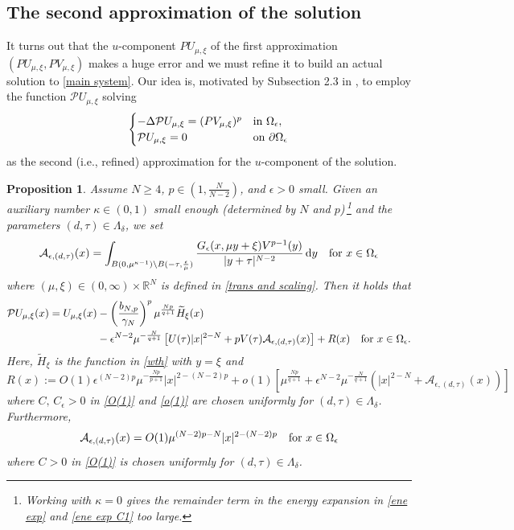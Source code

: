 \documentclass[reqno]{amsart}
\newtheorem{proposition}[theorem]{Proposition}
\theoremstyle{remark}
\newcommand{\pa}{\partial}
\newcommand{\ep}{\epsilon}
\newcommand{\ga}{\gamma}
\newcommand{\R}{\mathbb{R}}
\newcommand{\mca}{\mathcal{A}}
\newcommand{\mcp}{\mathcal{P}}
\newcommand{\wth}{\widetilde{H}}
\newcommand{\dy}{\textup{d}y}
\newcommand{\mx}{{\mu,\xi}}
\renewcommand{\(}{\left(}
\renewcommand{\)}{\right)}
\numberwithin{equation}{section}
\begin{document}
\subsection{The second approximation of the solution}
It turns out that the $u$-component $PU_\mx$ of the first approximation $(PU_\mx, PV_\mx)$ makes a huge error and we must refine it to build an actual solution to \eqref{main system}.
Our idea is, motivated by Subsection 2.3 in \cite{KP}, to employ the function $\mcp U_\mx$ solving
\begin{equation}\label{mcp U eq}
\begin{cases}
-\Delta \mcp U_\mx = (PV_\mx)^p &\textup{in } \Omega_\ep,\\
\mcp U_\mx =0 &\textup{on } \pa \Omega_\ep
\end{cases}
\end{equation}
as the second (i.e., refined) approximation for the $u$-component of the solution.
\begin{proposition}\label{second approx}
Assume $N \ge 4$, $p \in (1,\frac{N}{N-2})$, and $\ep > 0$ small. Given an auxiliary number $\kappa \in (0,1)$ small enough (determined by $N$ and $p$)\,\footnote{Working with $\kappa = 0$
gives the remainder term in the energy expansion in \eqref{ene exp} and \eqref{ene exp C1} too large.} and the parameters $(d,\tau) \in \Lambda_\delta$, we set
\begin{equation}\label{A mu}
\mca_{\ep,(d,\tau)}(x) = \int_{B(0,\mu^{\kappa-1})\setminus B(-\tau,\frac{\ep}{\mu})} \frac{G_\ep(x,\mu y+\xi)V^{p-1}(y)}{|y+\tau|^{N-2}}\, \dy \quad \textup{for } x \in \Omega_\ep
\end{equation}
where $(\mu,\xi) \in (0,\infty) \times \R^N$ is defined in \eqref{trans and scaling}. Then it holds that
\begin{equation}\label{mcp U}
\begin{aligned}
\mcp U_\mx(x) = U_\mx(x)
&- \(\frac{b_{N,p}}{\ga_N}\)^p\mu^{\frac{Np}{q+1}}\wth_\xi(x) \\
&- \ep^{N-2}\mu^{-\frac{N}{q+1}} \left[U(\tau) {|x|^{2-N}} +p V(\tau) \mca_{\ep,(d,\tau)}(x)\right] + R(x) \quad \textup{for } x \in \Omega_\ep.
\end{aligned}
\end{equation}
Here, $\wth_\xi$ is the function in \eqref{wth} with $y = \xi$ and
\begin{equation}\label{R}
R(x) := O(1) \ep^{(N-2)p}\mu^{-\frac{Np}{p+1}}|x|^{2-(N-2)p} + o(1)\left[\mu^{\frac{N p}{q+1}} + \ep^{N-2}\mu^{-\frac{N}{q+1}} \({|x|^{2-N}}+\mca_{\ep,(d,\tau)}(x)\)\right]
\end{equation}
where $C,\, C_\ep > 0$ in \eqref{O(1)} and \eqref{o(1)} are chosen uniformly for $(d,\tau)\in \Lambda_\delta$. Furthermore,
\begin{equation}\label{mca est}
\mca_{\ep,(d,\tau)}(x) = O(1)\mu^{(N-2)p-N}|x|^{2-(N-2)p} \quad \textup{for } x \in \Omega_\ep
\end{equation}
where $C > 0$ in \eqref{O(1)} is chosen uniformly for $(d,\tau)\in \Lambda_\delta$.
\end{proposition}
\end{document}
